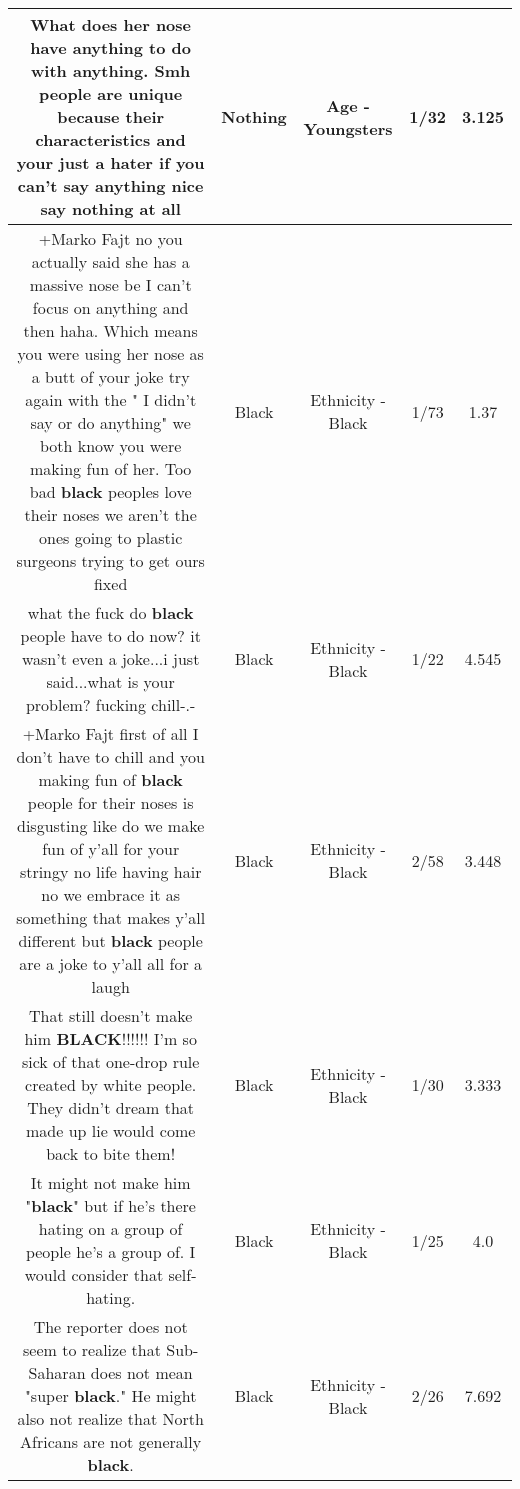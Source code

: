 \documentclass[11pt]{article}
\newlength\mylength
\begin{document}
\begin{center}
\begin{longtable}{|C{.65\mylength}|C{.30\mylength}|C{.12\mylength}|C{.12\mylength}|C{.12\mylength}|}
  \small What does her nose have anything to do with anything. Smh people are unique because their characteristics and your just a hater if you can't say anything nice say \textbf{nothing} at all\normalsize   & Nothing & Age - Youngsters & 1/32 & 3.125 \\  \hline
  \small +Marko Fajt no you actually said she has a massive nose be I can't focus on anything and then haha. Which means you were using her nose as a butt of your joke try again with the " I didn't say or do anything" we both know you were making fun of her. Too bad \textbf{black} peoples love their noses we aren't the ones going to plastic surgeons trying to get ours fixed\normalsize   & Black & Ethnicity - Black & 1/73 & 1.37 \\  \hline
  \small what the fuck do \textbf{black} people have to do now? it wasn't even a joke...i just said...what is your problem? fucking chill-.-\normalsize   & Black & Ethnicity - Black & 1/22 & 4.545 \\  \hline
  \small +Marko Fajt first of all I don't have to chill and you making fun of \textbf{black} people for their noses is disgusting like do we make fun of y'all for your stringy no life having hair no we embrace it as something that makes y'all different but \textbf{black} people are a joke to y'all all for a laugh\normalsize   & Black & Ethnicity - Black & 2/58 & 3.448 \\  \hline
  \small That still doesn't make him \textbf{BLACK}!!!!!! I'm so sick of that one-drop rule created by white people.  They didn't dream that made up lie would come back to bite them!\normalsize   & Black & Ethnicity - Black & 1/30 & 3.333 \\  \hline
  \small It might not make him "\textbf{black}" but if he's there hating on a group of people he's a group of. I would consider that self-hating.\normalsize   & Black & Ethnicity - Black & 1/25 & 4.0 \\  \hline
  \small The reporter does not seem to realize that Sub-Saharan does not mean "super \textbf{black}."  He might also not realize that North Africans are not generally \textbf{black}.\normalsize   & Black & Ethnicity - Black & 2/26 & 7.692 \\  \hline

\end{longtable}
\end{center}
\end{document}
